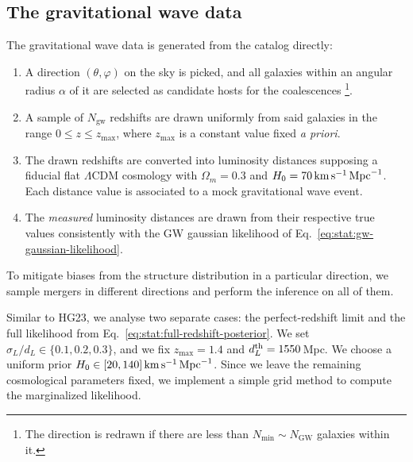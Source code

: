 \documentclass[%
preprint,
nofootinbib,
 amsmath,amssymb,
 aps,
]{revtex4-2}
\begin{document}
\subsection{The gravitational wave data}

The gravitational wave data is generated from the catalog directly:

\begin{enumerate}
	\item A direction $(\theta, \varphi)$ on the sky is picked, and all galaxies within an angular radius
	      $\alpha$ of it are selected as candidate hosts for the coalescences \footnote{The direction is
		      redrawn if there are less than $N_{\text{min}} \sim N_\text{GW}$ galaxies within it.}.
	\item A sample of $N_\text{gw}$ redshifts are drawn uniformly from said galaxies in the range $0 \leq z
		      \leq z_\text{max}$, where $z_\text{max}$ is a constant value fixed \textit{a priori}.
	\item The drawn redshifts are converted into  luminosity distances supposing a fiducial flat
	      $\Lambda$CDM cosmology with $\Omega_m = 0.3$ and $H_0 = 70 \, \rm{km} \, \rm{s}^{-1} \,
		      \rm{Mpc}^{-1}$. Each distance value is associated to a mock gravitational wave event.
	\item The \textit{measured} luminosity distances are drawn from their respective true values consistently
	      with the GW gaussian likelihood of Eq.~\eqref{eq:stat:gw-gaussian-likelihood}.

\end{enumerate}

To mitigate biases from the structure distribution in a particular direction, we sample mergers in
different directions and perform the inference on all of them.

Similar to HG23, we analyse two separate cases: the perfect-redshift limit and the full likelihood
from Eq.~\eqref{eq:stat:full-redshift-posterior}. We set $\sigma_L / d_L \in \{0.1, 0.2, 0.3\}$,
and we fix $z_\text{max} = 1.4$ and $d_L^{\rm{th}} = 1550 \,$Mpc. We choose a uniform prior $ H_0
	\in [20, 140] \, \rm{km} \, \rm{s}^{-1} \, \rm{Mpc}^{-1}$. Since we leave the remaining
cosmological parameters fixed, we implement a simple grid method to compute the marginalized
likelihood.
\end{document}

